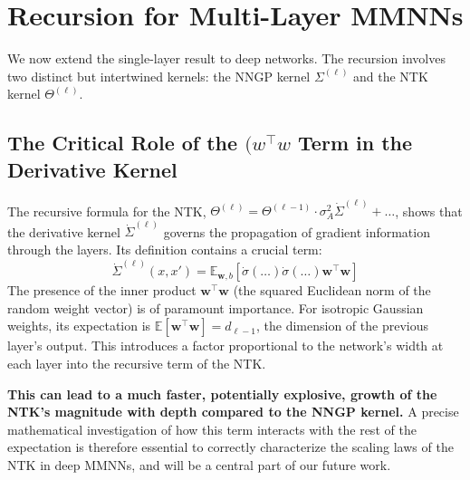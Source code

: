 \documentclass[12pt]{article}
\begin{document}
\section{Recursion for Multi-Layer MMNNs}
We now extend the single-layer result to deep networks. The recursion involves two distinct but intertwined kernels: the NNGP kernel $\Sigma^{(\ell)}$ and the NTK kernel $\Theta^{(\ell)}$.

\subsection{The Critical Role of the $({w}^\top{w}$ Term in the Derivative Kernel}
The recursive formula for the NTK, $\Theta^{(\ell)} = \Theta^{(\ell-1)} \cdot \sigma_A^2 \dot{\Sigma}^{(\ell)} + \dots$, shows that the derivative kernel $\dot{\Sigma}^{(\ell)}$ governs the propagation of gradient information through the layers. Its definition contains a crucial term:
\[ \dot{\Sigma}^{(\ell)}(x, x') = \mathbb{E}_{\bm{w}, b} \left[ \dot{\sigma}(\dots) \dot{\sigma}(\dots) \bm{w}^\top\bm{w} \right] \]
The presence of the inner product $\bm{w}^\top\bm{w}$ (the squared Euclidean norm of the random weight vector) is of paramount importance. For isotropic Gaussian weights, its expectation is $\mathbb{E}[\bm{w}^\top\bm{w}] = d_{\ell-1}$, the dimension of the previous layer's output. This introduces a factor proportional to the network's width at each layer into the recursive term of the NTK.

\textbf{This can lead to a much faster, potentially explosive, growth of the NTK's magnitude with depth compared to the NNGP kernel.} A precise mathematical investigation of how this term interacts with the rest of the expectation is therefore essential to correctly characterize the scaling laws of the NTK in deep MMNNs, and will be a central part of our future work.
\end{document}

